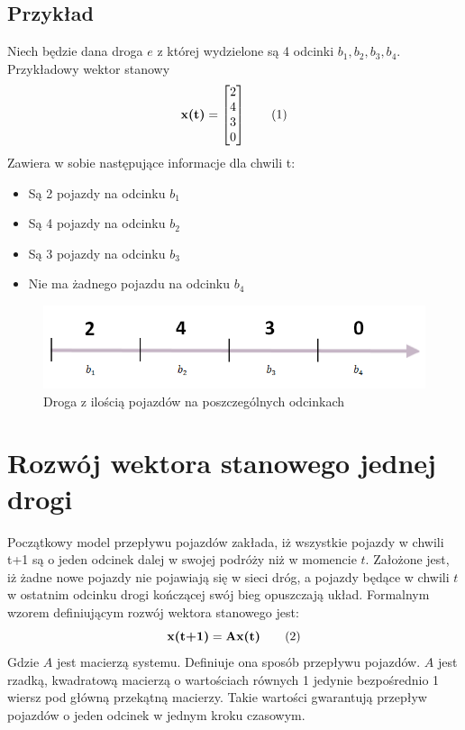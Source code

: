 \documentclass[12pt]{book}
\theoremstyle{plain}
\newcommand\addtag{\refstepcounter{equation}
\renewcommand{\labelenumii}{\theenumii}
\renewcommand{\theenumii}{\theenumi.\arabic{enumii}.}
\tag{\theequation}}
\begin{document}
\subsection{Przykład} \label{subsec:example-single-road}
Niech będzie dana droga $e$ z której wydzielone są 4 odcinki ${b_1,b_2,b_3,b_4}$. Przykładowy wektor stanowy
\[\textbf{x(t)}=\begin{bmatrix}
2 \\ 4 \\ 3 \\ 0
\end{bmatrix} \addtag \]
Zawiera w sobie następujące informacje dla chwili t:
\begin{itemize}
	\item Są 2 pojazdy na odcinku $b_1$
	\item Są 4 pojazdy na odcinku $b_2$
	\item Są 3 pojazdy na odcinku $b_3$
	\item Nie ma żadnego pojazdu na odcinku $b_4$
\end{itemize}

\begin{figure}[H]
	\centering
	\includegraphics[width=14cm]{single_road_example}
	\caption{Droga z ilością pojazdów na poszczególnych odcinkach}
	\label{fig:single_road}
\end{figure}
\section{Rozwój wektora stanowego jednej drogi}
Początkowy model przepływu pojazdów zakłada, iż wszystkie pojazdy w chwili t+1 są o jeden odcinek dalej w swojej podróży niż w momencie $t$. Założone jest, iż żadne nowe pojazdy nie pojawiają się w sieci dróg, a pojazdy będące w chwili $t$ w ostatnim odcinku drogi kończącej swój bieg opuszczają układ. Formalnym wzorem definiującym rozwój wektora stanowego jest:
\[\textbf{x(t+1)}=\textbf{Ax(t)} \addtag \label{eq:single_road} \]
Gdzie $A$ jest macierzą systemu. Definiuje ona sposób przepływu pojazdów. $A$ jest rzadką, kwadratową macierzą o wartościach równych 1 jedynie bezpośrednio 1 wiersz pod główną przekątną macierzy. Takie wartości gwarantują przepływ pojazdów o jeden odcinek w jednym kroku czasowym.
\end{document}
